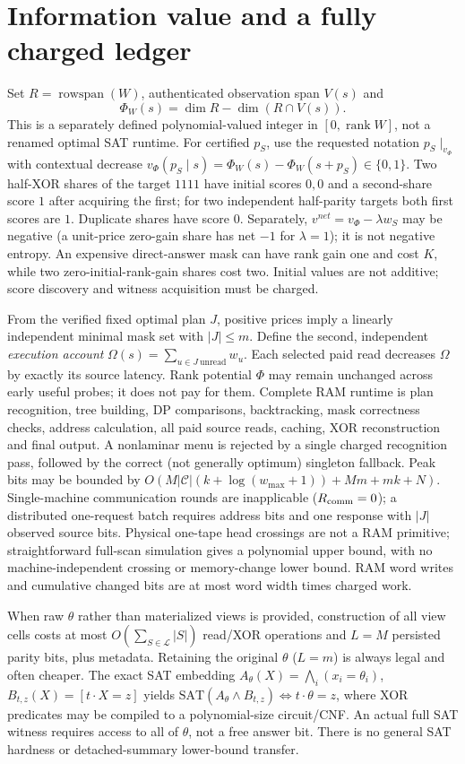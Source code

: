 \documentclass[11pt]{article}
\begin{document}
\section{Information value and a fully charged ledger}
Set $R=\operatorname{rowspan}(W)$, authenticated observation span $V(s)$ and
\[
 \Phi_W(s)=\dim R-\dim(R\cap V(s)).
\]
This is a separately defined polynomial-valued integer in $[0,\operatorname{rank}W]$, not a renamed optimal SAT runtime. For certified $p_S$, use the requested notation $p_S\mid_{v_\Phi}$ with contextual decrease $v_\Phi(p_S\mid s)=\Phi_W(s)-\Phi_W(s\!+\!p_S)\in\{0,1\}$. Two half-XOR shares of the target $1111$ have initial scores $0,0$ and a second-share score $1$ after acquiring the first; for two independent half-parity targets both first scores are $1$. Duplicate shares have score $0$. Separately, $v^{net}=v_\Phi-\lambda w_S$ may be negative (a unit-price zero-gain share has net $-1$ for $\lambda=1$); it is not negative entropy. An expensive direct-answer mask can have rank gain one and cost $K$, while two zero-initial-rank-gain shares cost two. Initial values are not additive; score discovery and witness acquisition must be charged.

From the verified fixed optimal plan $J$, positive prices imply a linearly independent minimal mask set with $|J|\le m$. Define the second, independent \emph{execution account} $\Omega(s)=\sum_{u\in J\mathrm{\ unread}}w_u$. Each selected paid read decreases $\Omega$ by exactly its source latency. Rank potential $\Phi$ may remain unchanged across early useful probes; it does not pay for them. Complete RAM runtime is plan recognition, tree building, DP comparisons, backtracking, mask correctness checks, address calculation, all paid source reads, caching, XOR reconstruction and final output. A nonlaminar menu is rejected by a single charged recognition pass, followed by the correct (not generally optimum) singleton fallback. Peak bits may be bounded by $O(M|\mathcal C|(k+\log(w_{\max}+1))+Mm+mk+N)$. Single-machine communication rounds are inapplicable ($R_{\rm comm}=0$); a distributed one-request batch requires address bits and one response with $|J|$ observed source bits. Physical one-tape head crossings are not a RAM primitive; straightforward full-scan simulation gives a polynomial upper bound, with no machine-independent crossing or memory-change lower bound. RAM word writes and cumulative changed bits are at most word width times charged work.

When raw $\theta$ rather than materialized views is provided, construction of all view cells costs at most $O(\sum_{S\in\mathcal L}|S|)$ read/XOR operations and $L=M$ persisted parity bits, plus metadata. Retaining the original $\theta$ ($L=m$) is always legal and often cheaper. The exact SAT embedding $A_\theta(X)=\bigwedge_i(x_i=\theta_i)$, $B_{t,z}(X)=[t\cdot X=z]$ yields $\mathrm{SAT}(A_\theta\land B_{t,z})\Leftrightarrow t\cdot\theta=z$, where XOR predicates may be compiled to a polynomial-size circuit/CNF. An actual full SAT witness requires access to all of $\theta$, not a free answer bit. There is no general SAT hardness or detached-summary lower-bound transfer.
\end{document}
